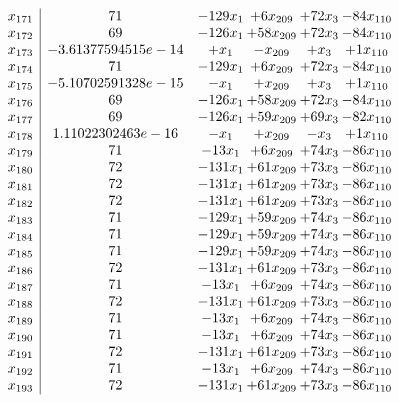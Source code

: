 \documentclass[11pt]{article}
\begin{document}
\[\begin{array}{c| c c@{\hskip 2pt} c@{\hskip 2pt} c@{\hskip 2pt} c@{\hskip 2pt} }
 x_{171}   &  71 & -129 x_{1} & + 6 x_{209} & + 72 x_{3} & -84 x_{110}\\
 x_{172}   &  69 & -126 x_{1} & + 58 x_{209} & + 72 x_{3} & -84 x_{110}\\
 x_{173}   &  -3.61377594515e-14 & +  x_{1} & - x_{209} & +  x_{3} & + 1 x_{110}\\
 x_{174}   &  71 & -129 x_{1} & + 6 x_{209} & + 72 x_{3} & -84 x_{110}\\
 x_{175}   &  -5.10702591328e-15 & - x_{1} & +  x_{209} & +  x_{3} & + 1 x_{110}\\
 x_{176}   &  69 & -126 x_{1} & + 58 x_{209} & + 72 x_{3} & -84 x_{110}\\
 x_{177}   &  69 & -126 x_{1} & + 59 x_{209} & + 69 x_{3} & -82 x_{110}\\
 x_{178}   &  1.11022302463e-16 & - x_{1} & +  x_{209} & - x_{3} & + 1 x_{110}\\
 x_{179}   &  71 & -13 x_{1} & + 6 x_{209} & + 74 x_{3} & -86 x_{110}\\
 x_{180}   &  72 & -131 x_{1} & + 61 x_{209} & + 73 x_{3} & -86 x_{110}\\
 x_{181}   &  72 & -131 x_{1} & + 61 x_{209} & + 73 x_{3} & -86 x_{110}\\
 x_{182}   &  72 & -131 x_{1} & + 61 x_{209} & + 73 x_{3} & -86 x_{110}\\
 x_{183}   &  71 & -129 x_{1} & + 59 x_{209} & + 74 x_{3} & -86 x_{110}\\
 x_{184}   &  71 & -129 x_{1} & + 59 x_{209} & + 74 x_{3} & -86 x_{110}\\
 x_{185}   &  71 & -129 x_{1} & + 59 x_{209} & + 74 x_{3} & -86 x_{110}\\
 x_{186}   &  72 & -131 x_{1} & + 61 x_{209} & + 73 x_{3} & -86 x_{110}\\
 x_{187}   &  71 & -13 x_{1} & + 6 x_{209} & + 74 x_{3} & -86 x_{110}\\
 x_{188}   &  72 & -131 x_{1} & + 61 x_{209} & + 73 x_{3} & -86 x_{110}\\
 x_{189}   &  71 & -13 x_{1} & + 6 x_{209} & + 74 x_{3} & -86 x_{110}\\
 x_{190}   &  71 & -13 x_{1} & + 6 x_{209} & + 74 x_{3} & -86 x_{110}\\
 x_{191}   &  72 & -131 x_{1} & + 61 x_{209} & + 73 x_{3} & -86 x_{110}\\
 x_{192}   &  71 & -13 x_{1} & + 6 x_{209} & + 74 x_{3} & -86 x_{110}\\
 x_{193}   &  72 & -131 x_{1} & + 61 x_{209} & + 73 x_{3} & -86 x_{110}\\

\end{array}\]
\end{document}

